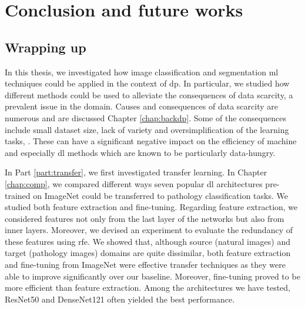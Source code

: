 \chapter{Conclusion and future works}
\label{chap:conclusions}

\section{Wrapping up}
\label{sec:concl:wrappingup}

In this thesis, we investigated how image classification and segmentation \acrlong{ml} techniques could be applied in the context of \acrlong{dp}. In particular, we studied how different methods could be used to alleviate the consequences of data scarcity, a prevalent issue in the domain. Causes and consequences of data scarcity are numerous and are discussed Chapter \ref{chap:backdp}. Some of the consequences include small dataset size, lack of variety and oversimplification of the learning tasks, \etc. These can have a significant negative impact on the efficiency of machine and especially \acrlong{dl} methods which are known to be particularly data-hungry. 

In Part \ref{part:transfer}, we first investigated transfer learning. In Chapter \ref{chap:comp}, we compared different ways seven popular \acrlong{dl} architectures pre-trained on ImageNet could be transferred to pathology classification tasks. We studied both feature extraction and fine-tuning. Regarding feature extraction, we considered features not only from the last layer of the networks but also from inner layers. Moreover, we devised an experiment to evaluate the redundancy of these features using \acrlong{rfe}. We showed that, although source (\ie natural images) and target (\ie pathology images) domains are quite dissimilar, both feature extraction and fine-tuning from ImageNet were effective transfer techniques as they were able to improve significantly over our baseline. Moreover, fine-tuning proved to be more efficient than feature extraction. Among the architectures we have tested, ResNet50 and DenseNet121 often yielded the best performance.

